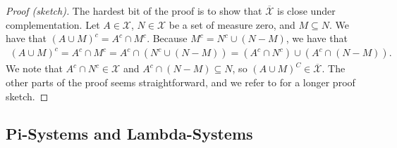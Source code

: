 \documentclass[10pt]{article}
\newcommand{\mcal}[1]{\mathcal{#1}}
\begin{document}
\begin{itemize}
  \begin{proof}[Proof (sketch)]
    The hardest bit of the proof is to show that $\overline{\mcal{X}}$ is close under complementation. Let $A \in \mcal{X}$, $N \in \mcal{X}$ be a set of measure zero, and $M \subseteq N$. We have that $(A \cup M)^c = A^c \cap M^c$. Because $M^c = N^c \cup (N - M)$, we have that
    \begin{align*}
      (A \cup M)^c = A^c \cap M^c = A^c \cap ( N^c \cup (N-M) ) = (A^c \cap N^c) \cup (A^c \cap (N-M)).
    \end{align*}
    We note that $A^c \cap N^c \in \mcal{X}$ and $A^c \cap (N - M) \subseteq N$, so $(A \cup M)^C \in \overline{\mcal{X}}$. The other parts of the proof seems straightforward, and we refer to \cite{Hunter:2011} for a longer proof sketch.
  \end{proof}
\end{itemize}

\subsection{Pi-Systems and Lambda-Systems}
\end{document}
